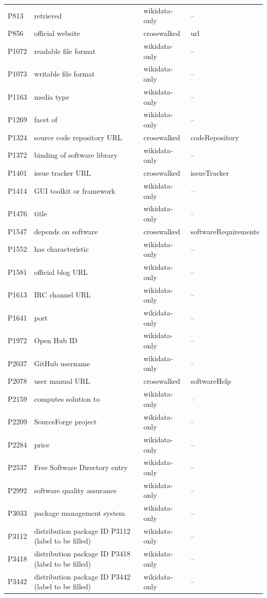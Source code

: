 \begin{longtable}{llll}
P813 & retrieved & wikidata-only & -- \\
P856 & official website & crosswalked & url \\
P1072 & readable file format & wikidata-only & -- \\
P1073 & writable file format & wikidata-only & -- \\
P1163 & media type & wikidata-only & -- \\
P1269 & facet of & wikidata-only & -- \\
P1324 & source code repository URL & crosswalked & codeRepository \\
P1372 & binding of software library & wikidata-only & -- \\
P1401 & issue tracker URL & crosswalked & issueTracker \\
P1414 & GUI toolkit or framework & wikidata-only & -- \\
P1476 & title & wikidata-only & -- \\
P1547 & depends on software & crosswalked & softwareRequirements \\
P1552 & has characteristic & wikidata-only & -- \\
P1581 & official blog URL & wikidata-only & -- \\
P1613 & IRC channel URL & wikidata-only & -- \\
P1641 & port & wikidata-only & -- \\
P1972 & Open Hub ID & wikidata-only & -- \\
P2037 & GitHub username & wikidata-only & -- \\
P2078 & user manual URL & crosswalked & softwareHelp \\
P2159 & computes solution to & wikidata-only & -- \\
P2209 & SourceForge project & wikidata-only & -- \\
P2284 & price & wikidata-only & -- \\
P2537 & Free Software Directory entry & wikidata-only & -- \\
P2992 & software quality assurance & wikidata-only & -- \\
P3033 & package management system & wikidata-only & -- \\
P3112 & distribution package ID P3112 (label to be filled) & wikidata-only & -- \\
P3418 & distribution package ID P3418 (label to be filled) & wikidata-only & -- \\
P3442 & distribution package ID P3442 (label to be filled) & wikidata-only & -- \\

\end{longtable}
